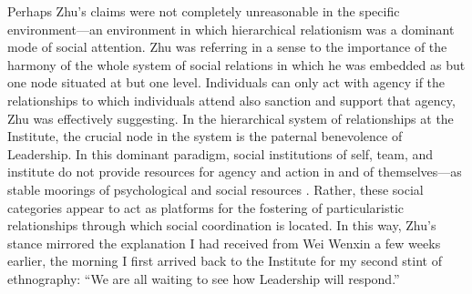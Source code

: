 \begin{CJK}{UTF8}{gbsn}
Perhaps Zhu's claims were not completely unreasonable in the specific environment---an environment in which hierarchical relationism was a dominant mode of social attention.  Zhu was referring in a sense to the importance of the harmony of the whole system of social relations in which he was embedded as but one node situated at but one level. Individuals can only act with agency if the relationships to which individuals attend also sanction and support that agency, Zhu was effectively suggesting.  In the hierarchical system of relationships at the Institute, the crucial node in the system is the paternal benevolence of Leadership.  In this dominant paradigm, social institutions of self, team, and institute do not provide resources for agency and action in and of themselves---as stable moorings of psychological and social resources \citep{Yuki2003}.  Rather, these social categories appear to act as platforms for the fostering of particularistic relationships through which social coordination is located.  In this way, Zhu's stance mirrored the explanation I had received from Wei Wenxin a few weeks earlier, the morning I first arrived back to the Institute for my second stint of ethnography: ``We are all waiting to see how Leadership will respond.''


  \end{CJK}
